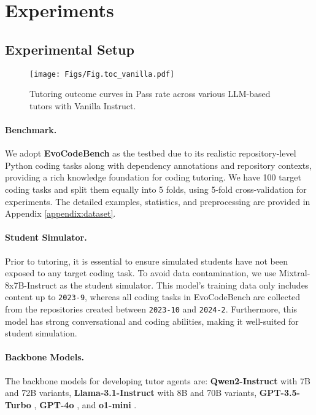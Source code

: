 \section{Experiments}

\subsection{Experimental Setup}

\begin{figure*}[t!]
\centering
\texttt{[image: Figs/Fig.toc\_vanilla.pdf]}
\caption{Tutoring outcome curves in Pass rate across various LLM-based tutors with Vanilla Instruct.}
\label{fig:toc_base}
\vspace{-4pt}
\end{figure*}


\paragraph{Benchmark.}
We adopt \textbf{EvoCodeBench} \cite{li2024evocodebench} as the testbed due to its realistic repository-level Python coding tasks along with dependency annotations and repository contexts, providing a rich knowledge foundation for coding tutoring. 
We have 100 target coding tasks and split them equally into 5 folds, using 5-fold cross-validation for experiments. The detailed examples, statistics, and preprocessing are provided in Appendix \ref{appendix:dataset}.


\paragraph{Student Simulator.}
Prior to tutoring, it is essential to ensure simulated students have not been exposed to any target coding task. To avoid data contamination, we use Mixtral-8x7B-Instruct \cite{jiang2024mixtral} as the student simulator. This model's training data only includes content up to \texttt{2023-9}, whereas all coding tasks in EvoCodeBench are collected from the repositories created between \texttt{2023-10} and \texttt{2024-2}. Furthermore, this model has strong conversational and coding abilities, making it well-suited for student simulation.



\paragraph{Backbone Models.}
The backbone models for developing tutor agents are: \textbf{Qwen2-Instruct} \cite{yang2024qwen2} with 7B and 72B variants, \textbf{Llama-3.1-Instruct} \cite{dubey2024llama} with 8B and 70B variants, \textbf{GPT-3.5-Turbo} \cite{openai2022chatgpt}, \textbf{GPT-4o} \cite{openai2024gpt4o}, and \textbf{o1-mini} \cite{openai2024o1}.


